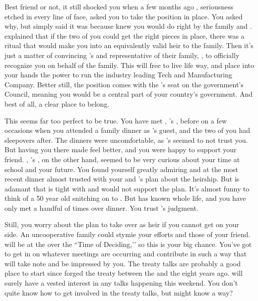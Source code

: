 \documentclass[char]{GL2020}
\begin{document}
Best friend or not, it still shocked you when a few months ago \cHeir{}, seriousness etched in every line of \cHeir{\their} face, asked you to take the position in \cHeir{\their} place. You asked \cHeir{\them} why, but \cHeir{\they} simply said it was because \cHeir{\they} knew you would do right by the family and \cTechGod{}. \cHeir{} explained that if the two of you could get the right pieces in place, there was a ritual that would make you into an equivalently valid heir to the family. Then it's just a matter of convincing \cHeir{}’s \cDiplomat{\auncle} and representative of their family, \cDiplomat{\intro}, to officially recognize you on behalf of the family. This will free \cHeir{} to live life \cHeir{\their} way, and place into your hands the power to run the industry leading \cHeir{\formal} Tech and Manufacturing Company. Better still, the position comes with the \cHeir{\formal}'s seat on the government's Council, meaning you would be a central part of your country's government. And best of all, a clear place to belong.

This seems far too perfect to be true. You have met \cFaledonParent{\full}, \cHeir{}’s \cFaledonParent{\parent}, before on a few occasions when you attended a \cHeir{\formal} family dinner as \cHeir{}’s guest, and the two of you had sleepovers after. The dinners were uncomfortable, as \cHeir{}'s \cFaledonParent{\parent} seemed to not trust you. But having you there made \cHeir{} feel better, and you were happy to support your friend. \cDiplomat{\full}, \cHeir{}’s \cDiplomat{\auncle}, on the other hand, seemed to be very curious about your time at school and your future. You found yourself greatly admiring \cDiplomat{\them} and at the most recent dinner almost trusted \cDiplomat{\them} with your and \cHeir{}’s plan about the heirship. But \cHeir{} is adamant that \cDiplomat{} is tight with \cDiplomat{\their} \cFaledonParent{\sibling} and would not support the plan. It’s almost funny to think of a 50 year old \cDiplomat{\person} snitching on \cDiplomat{\their} \cHeir{\nibling} to \cHeir{\their} \cFaledonParent{\parent}. But \cHeir{} has known \cDiplomat{} \cHeir{\their} whole life, and you have only met \cDiplomat{} a handful of times over dinner. You trust \cHeir{}’s judgment.

Still, you worry about the plan to take over as heir if you cannot get \cDiplomat{} on your side. An uncooperative \cHeir{\formal} family could stymie your efforts and those of your friend. \cDiplomat{} will be at the \pSchool{} over the ``Time of Deciding,’’ so this is your big chance. You've got to get in on whatever meetings are occurring and contribute in such a way that \cDiplomat{} will take note and be impressed by you. The treaty talks are probably a good place to start since \cDiplomat{\they} forged the treaty between the \pTech{} and the \pFarm{} eight years ago. \cDiplomat{\They} will surely have a vested interest in any talks happening this weekend.  You don’t quite know how to get involved in the treaty talks, but \cHeir{} might know a way?
\end{document}

